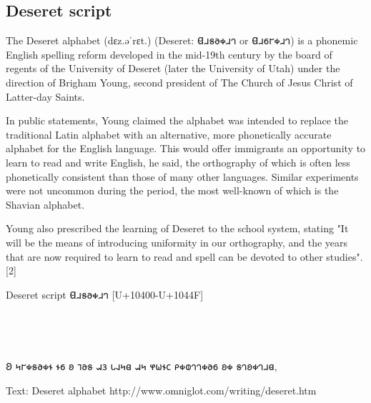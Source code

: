\subsection{Deseret script}
\newfontfamily{}

The Deseret alphabet (dɛz.əˈrɛt.) (Deseret: {\deseret 𐐔𐐯𐑅𐐨𐑉𐐯𐐻 or 𐐔𐐯𐑆𐐲𐑉𐐯𐐻}) is a phonemic English spelling reform developed in the mid-19th century by the board of regents of the University of Deseret (later the University of Utah) under the direction of Brigham Young, second president of The Church of Jesus Christ of Latter-day Saints.

In public statements, Young claimed the alphabet was intended to replace the traditional Latin alphabet with an alternative, more phonetically accurate alphabet for the English language. This would offer immigrants an opportunity to learn to read and write English, he said, the orthography of which is often less phonetically consistent than those of many other languages. Similar experiments were not uncommon during the period, the most well-known of which is the Shavian alphabet.

Young also prescribed the learning of Deseret to the school system, stating "It will be the means of introducing uniformity in our orthography, and the years that are now required to learn to read and spell can be devoted to other studies".[2]


Deseret script {\deseret 𐐔𐐯𐑅𐐨𐑉𐐯𐐻}  [U+10400-U+1044F]
\medskip

\bgroup
\par
\noindent
\colorbox{graphicbackground}{\color{black}^^A
\begin{minipage}{\textwidth}^^A
\parindent1pt
\vskip10pt
 \rightskip\leftskip
\deseret
\large

𐐂 𐑌𐐲𐑉𐑅𐐨𐑉𐐮 𐐮𐑆 𐐪 𐐹𐐨𐑅 𐐱𐑂 𐑊𐐰𐑌𐐼 𐐱𐑌 𐐸𐐶𐐮𐐽 𐑁𐑉𐐭𐐻𐐻𐑉𐐨𐑆 𐐪𐑉 𐑅𐐻𐐪𐑉𐐻𐐯𐐼,


\par
\vspace*{10pt}
\end{minipage}
}

Text: Deseret alphabet http://www.omniglot.com/writing/deseret.htm
\medskip
\egroup